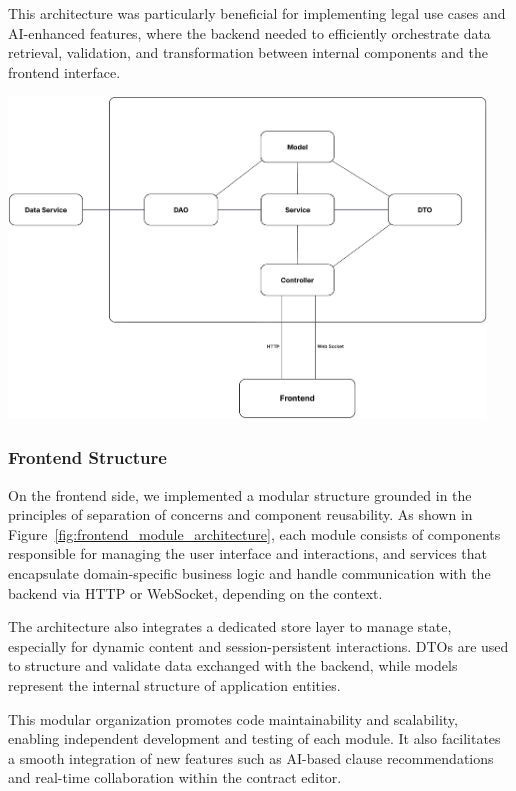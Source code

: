 This architecture was particularly beneficial for implementing legal use cases and AI-enhanced features, where the backend needed to efficiently orchestrate data retrieval, validation, and transformation between internal components and the frontend interface.

\begin{center}
    \includegraphics[width=0.95\textwidth]{Images/Layered Architecture of a Backend Module.png}
    \label{fig:backend_module_architecture}
\end{center}

\subsubsection{Frontend Structure}
On the frontend side, we implemented a modular structure grounded in the principles of separation of concerns and component reusability. As shown in Figure~\ref{fig:frontend_module_architecture}, each module consists of components responsible for managing the user interface and interactions, and services that encapsulate domain-specific business logic and handle communication with the backend via HTTP or WebSocket, depending on the context.\mynewline

The architecture also integrates a dedicated store layer to manage state, especially for dynamic content and session-persistent interactions. DTOs are used to structure and validate data exchanged with the backend, while models represent the internal structure of application entities.\mynewline

This modular organization promotes code maintainability and scalability, enabling independent development and testing of each module. It also facilitates a smooth integration of new features such as AI-based clause recommendations and real-time collaboration within the contract editor.


